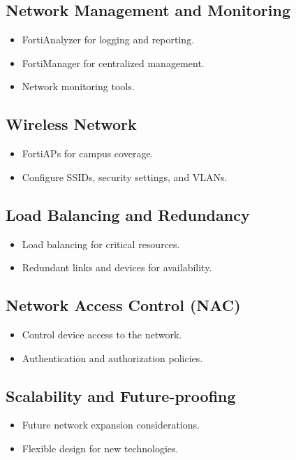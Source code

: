 \documentclass[12pt]{report}
\begin{document}
\subsection{Network Management and Monitoring}
\begin{itemize}
    \item FortiAnalyzer for logging and reporting.
    \item FortiManager for centralized management.
    \item Network monitoring tools.
\end{itemize}

\subsection{Wireless Network}
\begin{itemize}
    \item FortiAPs for campus coverage.
    \item Configure SSIDs, security settings, and VLANs.
\end{itemize}

\subsection{Load Balancing and Redundancy}
\begin{itemize}
    \item Load balancing for critical resources.
    \item Redundant links and devices for availability.
\end{itemize}

\subsection{Network Access Control (NAC)}
\begin{itemize}
    \item Control device access to the network.
    \item Authentication and authorization policies.
\end{itemize}

\subsection{Scalability and Future-proofing}
\begin{itemize}
    \item Future network expansion considerations.
    \item Flexible design for new technologies.
\end{itemize}
\end{document}
